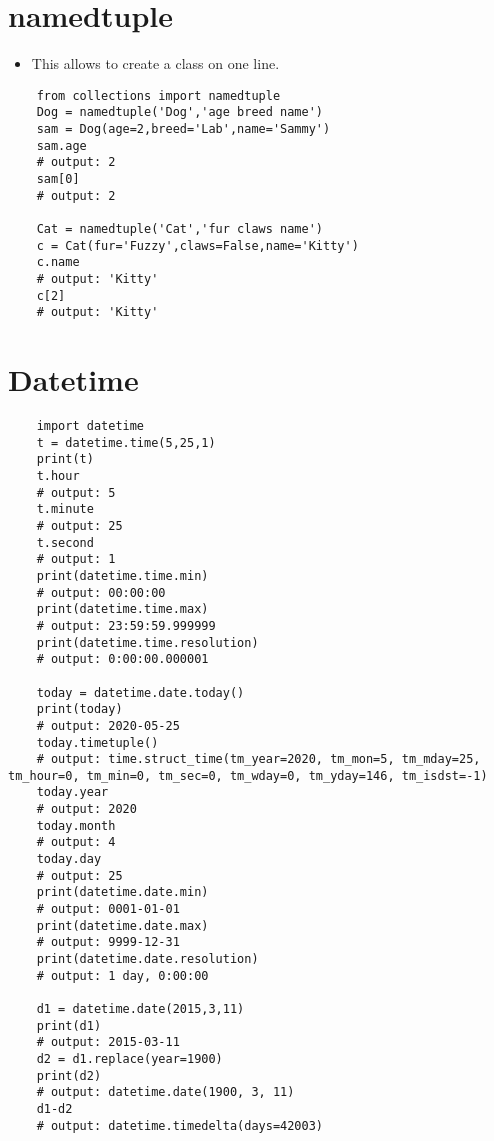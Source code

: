 \section{namedtuple}
\begin{itemize}
    \item This allows to create a class on one line. 
\end{itemize}
\begin{verbatim}
    from collections import namedtuple
    Dog = namedtuple('Dog','age breed name')
    sam = Dog(age=2,breed='Lab',name='Sammy')
    sam.age
    # output: 2
    sam[0]
    # output: 2

    Cat = namedtuple('Cat','fur claws name')
    c = Cat(fur='Fuzzy',claws=False,name='Kitty')
    c.name
    # output: 'Kitty'
    c[2]
    # output: 'Kitty'
\end{verbatim}


\section{Datetime}
\begin{verbatim}
    import datetime 
    t = datetime.time(5,25,1)
    print(t)
    t.hour
    # output: 5
    t.minute
    # output: 25
    t.second
    # output: 1
    print(datetime.time.min)
    # output: 00:00:00
    print(datetime.time.max)
    # output: 23:59:59.999999
    print(datetime.time.resolution)
    # output: 0:00:00.000001

    today = datetime.date.today() 
    print(today)
    # output: 2020-05-25
    today.timetuple() 
    # output: time.struct_time(tm_year=2020, tm_mon=5, tm_mday=25, tm_hour=0, tm_min=0, tm_sec=0, tm_wday=0, tm_yday=146, tm_isdst=-1)
    today.year
    # output: 2020
    today.month
    # output: 4
    today.day
    # output: 25
    print(datetime.date.min)
    # output: 0001-01-01
    print(datetime.date.max)
    # output: 9999-12-31
    print(datetime.date.resolution)
    # output: 1 day, 0:00:00

    d1 = datetime.date(2015,3,11)
    print(d1)
    # output: 2015-03-11
    d2 = d1.replace(year=1900)
    print(d2) 
    # output: datetime.date(1900, 3, 11)
    d1-d2 
    # output: datetime.timedelta(days=42003)
\end{verbatim}

